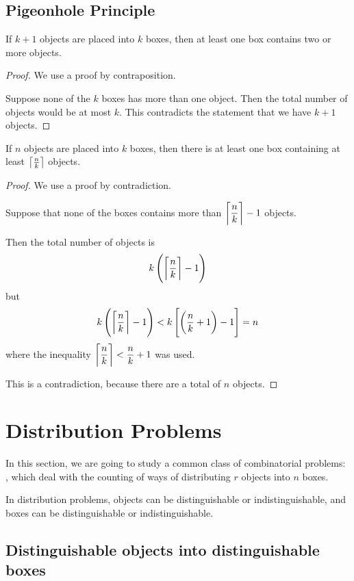 \subsection{Pigeonhole Principle}
\begin{theorem}
If $k+1$ objects are placed into $k$ boxes, then at least one box contains two or more objects. 
\end{theorem}

\begin{proof}
We use a proof by contraposition.

Suppose none of the $k$ boxes has more than one object. Then the total number of objects would be at most $k$. This contradicts the statement that we have $k+1$ objects.
\end{proof}

\begin{theorem} 
If $n$ objects are placed into $k$ boxes, then there is at least one box containing at least $\left\lceil \frac{n}{k} \right\rceil$ objects. 
\end{theorem}

\begin{proof}
We use a proof by contradiction.

Suppose that none of the boxes contains more than $\left\lceil \dfrac{n}{k} \right\rceil - 1$ objects.

Then the total number of objects is \[k\left(\left\lceil \frac{n}{k} \right\rceil-1\right)\] but \[ k\left(\left\lceil \frac{n}{k} \right\rceil - 1\right) < k \left[\left(\frac{n}{k} + 1\right) - 1\right] = n \]
where the inequality $\left\lceil \dfrac{n}{k} \right\rceil < \dfrac{n}{k}+1$ was used.

This is a contradiction, because there are a total of $n$ objects.
\end{proof}
\pagebreak

\section{Distribution Problems}
In this section, we are going to study a common class of combinatorial problems: , which deal with the counting of ways of distributing $r$ objects into $n$ boxes.

In distribution problems, objects can be distinguishable or indistinguishable, and boxes can be distinguishable or indistinguishable.

\subsection{Distinguishable objects into distinguishable boxes}


